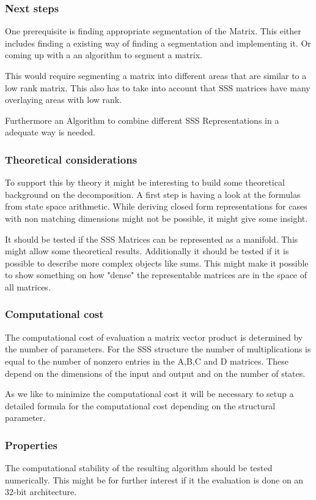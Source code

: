 \documentclass[lang=ngerman,inputenc=utf8,fontsize=10pt]{ldvarticle}
\begin{document}
\subsubsection*{Next steps}

One prerequisite is finding appropriate segmentation of the Matrix. This either includes finding a existing way of finding a segmentation and implementing it.
Or coming up with a an algorithm to segment a matrix.

This would require segmenting a matrix into different areas that are similar to a low rank matrix. This also has to take into account that SSS matrices have many overlaying areas with low rank.

Furthermore an Algorithm to combine different SSS Representations in a adequate way is needed.

\subsubsection*{Theoretical considerations}
To support this by theory it might be interesting to build some theoretical background on the decomposition.
A first step is having a look at the formulas from state space arithmetic. While deriving closed form representations for cases with non matching dimensions might not be possible, it might give some insight.

It should be tested if the SSS Matrices can be represented as a manifold. This might allow some theoretical results.
Additionally it should be tested if it is possible to describe more complex objects like sums.
This might make it possible to show something on how "dense" the representable matrices are in the space of all matrices.



\subsubsection*{Computational cost}
The computational cost of evaluation a matrix vector product is determined by the number of parameters.
For the SSS structure the number of multiplications is equal to the number of nonzero entries in the A,B,C and D matrices. These depend on the dimensions of the input and output and on the number of states.

As we like to minimize the computational cost it will be necessary to setup a detailed formula for the computational cost depending on the structural parameter.


\subsubsection*{Properties}
The computational stability of the resulting algorithm should be tested numerically. This might be for further interest if it the evaluation is done on an 32-bit architecture.
\end{document}
